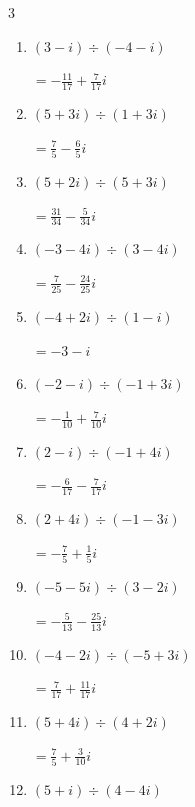 \begin{multicols}{3}
\begin{enumerate}
        $\displaystyle =\frac{1}{5}-\frac{4}{5}i$

  \item $\displaystyle (3-i)\div(-4-i)$

        $\displaystyle =-\frac{11}{17}+\frac{7}{17}i$

  \item $\displaystyle (5+3i)\div(1+3i)$

        $\displaystyle =\frac{7}{5}-\frac{6}{5}i$

  \item $\displaystyle (5+2i)\div(5+3i)$

        $\displaystyle =\frac{31}{34}-\frac{5}{34}i$

  \item $\displaystyle (-3-4i)\div(3-4i)$

        $\displaystyle =\frac{7}{25}-\frac{24}{25}i$

\columnbreak %

  \item $\displaystyle (-4+2i)\div(1-i)$

        $\displaystyle =-3-i$

  \item $\displaystyle (-2-i)\div(-1+3i)$

        $\displaystyle =-\frac{1}{10}+\frac{7}{10}i$

  \item $\displaystyle (2-i)\div(-1+4i)$

        $\displaystyle =-\frac{6}{17}-\frac{7}{17}i$

  \item $\displaystyle (2+4i)\div(-1-3i)$

        $\displaystyle =-\frac{7}{5}+\frac{1}{5}i$

  \item $\displaystyle (-5-5i)\div(3-2i)$

        $\displaystyle =-\frac{5}{13}-\frac{25}{13}i$

  \item $\displaystyle (-4-2i)\div(-5+3i)$

        $\displaystyle =\frac{7}{17}+\frac{11}{17}i$

  \item $\displaystyle (5+4i)\div(4+2i)$

        $\displaystyle =\frac{7}{5}+\frac{3}{10}i$

  \item $\displaystyle (5+i)\div(4-4i)$


\end{enumerate}
\end{multicols}
